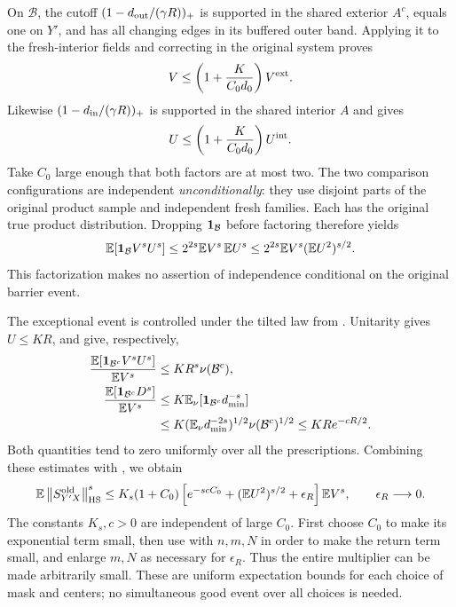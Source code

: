 On \(\mathcal B\), the cutoff
\((1-d_{\rm out}/(\gamma R))_+\) is supported in the shared exterior
\(A^c\), equals one on \(Y'\), and has all changing edges in its
buffered outer band. Applying it to the fresh-interior fields and
correcting in the original system proves
\[
                  V\le\left(1+\frac K{C_0d_0}\right)V^{\rm ext}.
\]
Likewise \((1-d_{\rm in}/(\gamma R))_+\) is supported in the shared
interior \(A\) and gives
\[
                  U\le\left(1+\frac K{C_0d_0}\right)U^{\rm int}.
\]
Take \(C_0\) large enough that both factors are at most two. The two
comparison configurations are independent \emph{unconditionally}:
they use disjoint parts of the original product sample and independent
fresh families. Each has the original true product distribution.
Dropping \(\mathbf 1_{\mathcal B}\) before factoring therefore yields
\begin{equation}\label{boot:factorization}
 \mathbb E[\mathbf 1_{\mathcal B}V^sU^s]
       \le 2^{2s}\mathbb E V^s\,\mathbb E U^s
       \le 2^{2s}\mathbb E V^s(\mathbb E U^2)^{s/2}.
\end{equation}
This factorization makes no assertion of independence conditional on
the original barrier event.

The exceptional event is controlled under the tilted law from
. Unitarity gives \(U\le K R\), and
 give, respectively,
\begin{align*}
 \frac{\mathbb E[\mathbf 1_{\mathcal B^c}V^sU^s]}{\mathbb E V^s}
       &\le K R^s\nu(\mathcal B^c),\\
 \frac{\mathbb E[\mathbf 1_{\mathcal B^c}D^s]}{\mathbb E V^s}
       &\le K\mathbb E_\nu[\mathbf 1_{\mathcal B^c}d_{\min}^{-s}]\\
       &\le K(\mathbb E_\nu d_{\min}^{-2s})^{1/2}
                    \nu(\mathcal B^c)^{1/2}
        \le K R e^{-cR/2}.
\end{align*}
Both quantities tend to zero uniformly over all the prescriptions.
Combining these estimates with , we obtain
\begin{equation}\label{boot:one-step}
 \mathbb E\left\lVert S^{\rm old}_{Y'X}\right\rVert_{\rm HS}^s
 \le K_s(1+C_0)
       \left[e^{-scC_0}+(\mathbb E U^2)^{s/2}+\epsilon_R\right]\mathbb E V^s,
 \qquad \epsilon_R\longrightarrow0.
\end{equation}
The constants \(K_s,c>0\) are independent of large \(C_0\). First
choose \(C_0\) to make its exponential term small, then use
 with \(n,m,N\) in order to make the return term
small, and enlarge \(m,N\) as necessary for \(\epsilon_R\). Thus the
entire multiplier can be made arbitrarily small. These are uniform
expectation bounds for each choice of mask and centers; no simultaneous
good event over all choices is needed.

